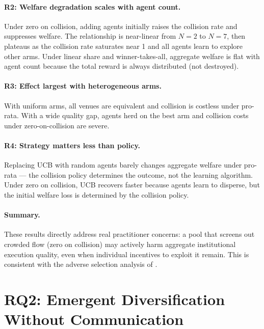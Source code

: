 \documentclass[11pt]{article}
\begin{document}
\paragraph{R2: Welfare degradation scales with agent count.}
Under zero on collision, adding agents initially raises the collision rate
and suppresses welfare. The relationship is near-linear from $N=2$ to
$N=7$, then plateaus as the collision rate saturates near 1 and all agents
learn to explore other arms.
Under linear share and winner-takes-all, aggregate welfare is flat with
agent count because the total reward is always distributed (not destroyed).

\paragraph{R3: Effect largest with heterogeneous arms.}
With uniform arms, all venues are equivalent and collision is costless
under pro-rata. With a wide quality gap, agents herd on the best arm and
collision costs under zero-on-collision are severe.

\paragraph{R4: Strategy matters less than policy.}
Replacing UCB with random agents barely changes aggregate welfare under
pro-rata — the collision policy determines the outcome, not the learning
algorithm. Under zero on collision, UCB recovers faster because agents
learn to disperse, but the initial welfare loss is determined by the
collision policy.

\paragraph{Summary.} These results directly address real practitioner
concerns: a pool that screens out crowded flow (zero on collision) may
actively harm aggregate institutional execution quality, even when
individual incentives to exploit it remain. This is consistent with the
adverse selection analysis of \citet{zhu2014}.

\section{RQ2: Emergent Diversification Without Communication}
\label{sec:rq2}
\end{document}
